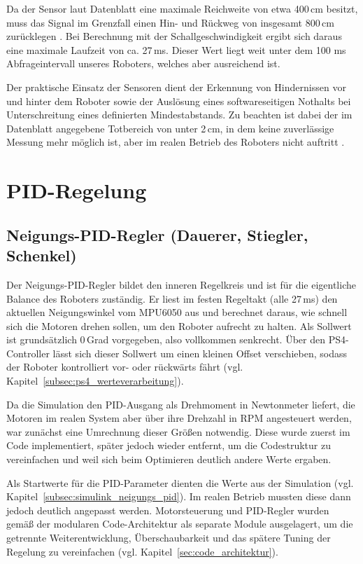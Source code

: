 \documentclass[fontsize=12pt,
parskip=half,	%
department=FakM,  %
logostyle=flat,
twoside, %
DIV=15,BCOR=10mm, %
]{OTHRreprt}
\begin{document}
Da der Sensor laut Datenblatt eine maximale Reichweite von etwa 400\,cm besitzt, muss das Signal im Grenzfall einen Hin- und Rückweg von insgesamt 800\,cm zurücklegen \cite{reicheltHCSR04_Datasheet}. Bei Berechnung mit der Schallgeschwindigkeit ergibt sich daraus eine maximale Laufzeit von ca. 27\,ms. Dieser Wert liegt weit unter dem 100 ms Abfrageintervall unseres Roboters, welches aber ausreichend ist.

Der praktische Einsatz der Sensoren dient der Erkennung von Hindernissen vor und hinter dem Roboter sowie der Auslösung eines softwareseitigen Nothalts bei Unterschreitung eines definierten Mindestabstands. Zu beachten ist dabei der im Datenblatt angegebene Totbereich von unter 2\,cm, in dem keine zuverlässige Messung mehr möglich ist, aber im realen Betrieb des Roboters nicht auftritt \cite{reicheltHCSR04_Datasheet}.

\section{PID-Regelung}
\label{sec:pid_regelung}

\subsection{Neigungs-PID-Regler (Dauerer, Stiegler, Schenkel)}
\label{subsec:neigung_pid_impl}

Der Neigungs-PID-Regler bildet den inneren Regelkreis und ist für die eigentliche Balance des Roboters zuständig.
Er liest im festen Regeltakt (alle 27\,ms) den aktuellen Neigungswinkel vom MPU6050 aus und berechnet 
daraus, wie schnell sich die Motoren drehen sollen, um den Roboter aufrecht zu halten.
Als Sollwert ist grundsätzlich 0\,Grad vorgegeben, 
also vollkommen senkrecht. Über den PS4-Controller lässt sich dieser Sollwert um 
einen kleinen Offset verschieben, sodass der Roboter kontrolliert vor- oder rückwärts fährt 
(vgl. Kapitel~\ref{subsec:ps4_werteverarbeitung}).

Da die Simulation den PID-Ausgang als Drehmoment in Newtonmeter liefert, die Motoren im realen System aber über 
ihre Drehzahl in RPM angesteuert werden, war zunächst eine Umrechnung dieser Größen notwendig. Diese
wurde zuerst im Code implementiert, später jedoch wieder entfernt, um die Codestruktur zu vereinfachen und weil
sich beim Optimieren deutlich andere Werte ergaben.

Als Startwerte für die PID-Parameter dienten die Werte aus der Simulation
(vgl. Kapitel~\ref{subsec:simulink_neigungs_pid}). Im realen Betrieb mussten diese dann jedoch
deutlich angepasst werden. 
Motorsteuerung und PID-Regler wurden gemäß der modularen Code-Architektur als separate Module ausgelagert,
um die getrennte Weiterentwicklung, Überschaubarkeit und das spätere Tuning der Regelung zu vereinfachen
(vgl. Kapitel~\ref{sec:code_architektur}).
\end{document}
